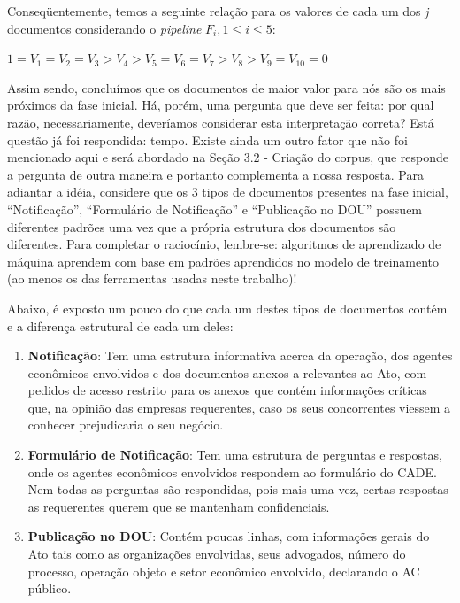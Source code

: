 \documentclass[11pt]{report}
\newcommand{\quotes}[1]{``#1''}
\begin{document}
Conseqüentemente, temos a seguinte relação para os valores de cada um dos \textit{j} documentos considerando o \textit{pipeline} $F_i, 1 \leq i \leq 5$:
\begin{center}
  $1 = V_1 = V_2 = V_3 > V_4 > V_5 = V_6 = V_7 > V_8 > V_9 = V_{10} = 0$
\end{center}

Assim sendo, concluímos que os documentos de maior valor para nós são os mais próximos da fase inicial. Há, porém, uma pergunta que deve ser feita: por qual razão,
necessariamente, deveríamos considerar esta interpretação correta? Está questão já foi respondida: tempo. Existe ainda um outro fator que não foi mencionado aqui e será abordado
na Seção 3.2 - Criação do corpus, que responde a pergunta de outra maneira e portanto complementa a nossa resposta. Para adiantar a idéia, considere que os 3 tipos de
documentos presentes na fase inicial, \quotes{Notificação}, \quotes{Formulário de Notificação} e \quotes{Publicação no DOU} possuem diferentes padrões uma vez que a própria
estrutura dos documentos são diferentes. Para completar o raciocínio, lembre-se: algoritmos de aprendizado de máquina aprendem com base em padrões aprendidos no modelo
de treinamento (ao menos os das ferramentas usadas neste trabalho)!

Abaixo, é exposto um pouco do que cada um destes tipos de documentos contém e a diferença estrutural de cada um deles:

\begin{enumerate}[label=\textbf{\arabic*.}]
\item \textbf{Notificação}: Tem uma estrutura informativa acerca da operação, dos agentes econômicos envolvidos e dos documentos anexos a relevantes ao Ato, com pedidos
de acesso restrito para os anexos que contém informações críticas que, na opinião das empresas requerentes, caso os seus concorrentes viessem a conhecer prejudicaria o seu negócio.
\item \textbf{Formulário de Notificação}: Tem uma estrutura de perguntas e respostas, onde os agentes econômicos envolvidos respondem ao formulário do CADE. Nem todas as perguntas
são respondidas, pois mais uma vez, certas respostas as requerentes querem que se mantenham confidenciais.
\item \textbf{Publicação no DOU}: Contém poucas linhas, com informações gerais do Ato tais como as organizações envolvidas, seus advogados, número do processo, operação objeto
e setor econômico envolvido, declarando o AC público.
\end{enumerate}
\end{document}
